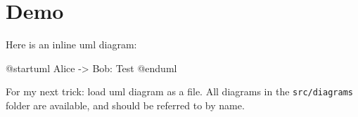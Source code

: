 \documentclass{scrartcl}
\begin{document}
\section{Demo}

Here is an inline uml diagram:

\begin{plantuml}
  @startuml
  Alice -> Bob: Test
  @enduml
\end{plantuml}

For my next trick: load uml diagram as a file.
All diagrams in the \texttt{src/diagrams} folder are available, and should be referred to by name.

\end{document}

